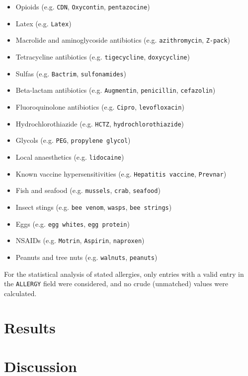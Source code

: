 \documentclass{article}
\begin{document}
\begin{itemize}
    \item Opioids (e.g. \texttt{CDN}, \texttt{Oxycontin}, \texttt{pentazocine})
    \item Latex (e.g. \texttt{Latex})
    \item Macrolide and aminoglycoside antibiotics (e.g. \texttt{azithromycin}, \texttt{Z-pack})
    \item Tetracycline antibiotics (e.g. \texttt{tigecycline}, \texttt{doxycycline})
    \item Sulfas (e.g. \texttt{Bactrim}, \texttt{sulfonamides})
    \item Beta-lactam antibiotics (e.g. \texttt{Augmentin}, \texttt{penicillin}, \texttt{cefazolin})
    \item Fluoroquinolone antibiotics (e.g. \texttt{Cipro}, \texttt{levofloxacin})
    \item Hydrochlorothiazide (e.g. \texttt{HCTZ}, \texttt{hydrochlorothiazide})
    \item Glycols (e.g. \texttt{PEG}, \texttt{propylene glycol})
    \item Local anaesthetics (e.g. \texttt{lidocaine})
    \item Known vaccine hypersensitivities (e.g. \texttt{Hepatitis vaccine}, \texttt{Prevnar})
    \item Fish and seafood (e.g. \texttt{mussels}, \texttt{crab}, \texttt{seafood})
    \item Insect stings (e.g. \texttt{bee venom}, \texttt{wasps}, \texttt{bee strings})
    \item Eggs (e.g. \texttt{egg whites}, \texttt{egg protein})
    \item NSAIDs (e.g. \texttt{Motrin}, \texttt{Aspirin}, \texttt{naproxen})
    \item Peanuts and tree nuts (e.g. \texttt{walnuts}, \texttt{peanuts})
\end{itemize}

For the statistical analysis of stated allergies, only entries with a valid entry in the \texttt{ALLERGY} field were considered, and no crude (unmatched) values were calculated.

\section{Results}



\section{Discussion}
\end{document}
